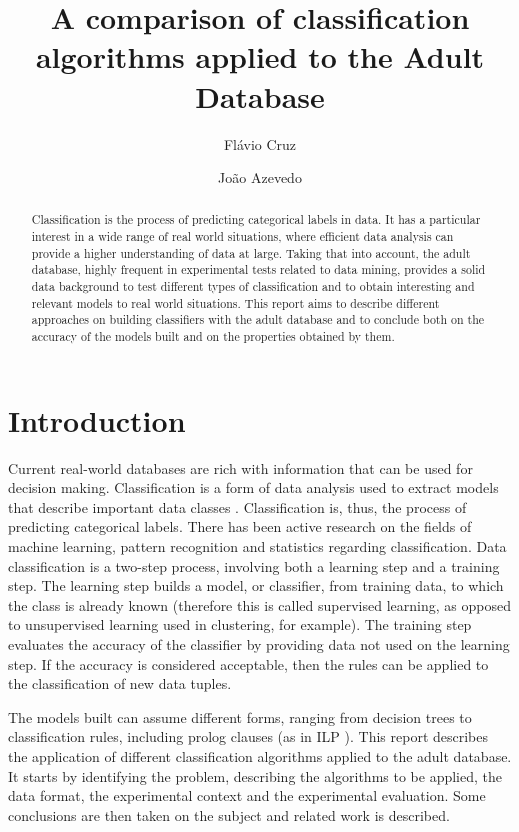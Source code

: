 \documentclass[a4paper]{llncs}
\begin{document}
\title{A comparison of classification algorithms applied to the Adult Database}
\author{Flávio Cruz \and João Azevedo}
\maketitle

\begin{abstract}
Classification is the process of predicting categorical labels in data. It has a
particular interest in a wide range of real world situations, where efficient
data analysis can provide a higher understanding of data at large. Taking that 
into account, the adult database, highly frequent in experimental tests related
to data mining, provides a solid data background to test different types of 
classification and to obtain interesting and relevant models to real world 
situations. This report aims to describe different approaches on building 
classifiers with the adult database and to conclude both on the accuracy of the
models built and on the properties obtained by them.
\end{abstract}

\section{Introduction}

Current real-world databases are rich with information that can be used for
decision making. Classification is a form of data analysis used to extract 
models that describe important data classes \cite{2}. Classification is, thus, 
the process of predicting categorical labels. There has been active research on 
the fields of machine learning, pattern recognition and statistics regarding 
classification. Data classification is a two-step process, involving both a 
learning step and a training step. The learning step builds a model, or 
classifier, from training data, to which the class is already known (therefore
this is called supervised learning, as opposed to unsupervised learning used in
clustering, for example). The training step evaluates the accuracy of the 
classifier by providing data not used on the learning step. If the accuracy is
considered acceptable, then the rules can be applied to the classification of
new data tuples.

The models built can assume different forms, ranging from decision trees to 
classification rules, including prolog clauses (as in ILP \cite{ilp}). This
report describes the application of different classification algorithms applied
to the adult database. It starts by identifying the problem, describing the
algorithms to be applied, the data format, the experimental context and the 
experimental evaluation. Some conclusions are then taken on the subject and 
related work is described.
\end{document}
